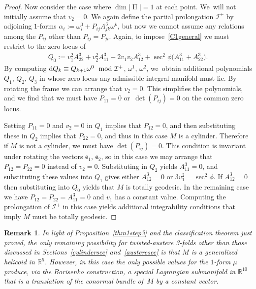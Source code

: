 \documentclass[10pt,a4paper]{amsart}
\def\R{\mathbb{R}}
\def\ve{\mathsf{e}}
\def\II{\operatorname{II}} %
\def\I{\mathcal{I}}
\def\w{\omega}
\newtheorem{Remark}[Theorem]{Remark}}
\numberwithin{equation}{section}
\begin{document}
\begin{proof}
Now consider the case where $\dim |\II|=1$ at each point. We~will not initially assume that $v_2=0$. We again define the partial prolongation $\I^+$ by adjoining $1$-forms $\alpha_i := \w^0_i + P_{ij} A^3_{jk} \w^k$, but now we cannot assume any relations among the $P_{ij}$ other than $P_{ij}=P_{ji}$. Again, to impose~\eqref{C1general} we must restrict to the zero locus of
\begin{gather*}
Q_0:=v_1^2 A^3_{22} + v_2^2 A^3_{11} - 2 v_1 v_2 A^3_{12} + \sec^2\phi \big(A^3_{11} + A^3_{22}\big).
\end{gather*}
By computing ${\rm d} Q_k \equiv Q_{k+1} \w^0 \mod \I^+$, $\w^1$, $\w^2$, we~obtain additional polynomials $Q_1$, $Q_2$, $Q_3$ in whose zero locus any admissible integral manifold must lie. By rotating the frame we can arrange that $v_2=0$. This simplifies the polynomials, and we find that we must have $P_{11}=0$ or~$\det(P_{ij})=0$ on the common zero locus.

Setting $P_{11}=0$ and $v_2=0$ in $Q_1$ implies that $P_{12}=0$, and then substituting these in $Q_2$ implies that $P_{22}=0$, and thus in this case $M$ is a cylinder. Therefore if $M$ is not a cylinder, we must have $\det(P_{ij})=0$. This condition is invariant under rotating the vectors $\ve_1$, $\ve_2$, so in this case we may arrange that $P_{12}=P_{22}=0$ instead of $v_2=0$. Substituting in $Q_2$ yields $A^3_{11}=0$, and substituting these values into $Q_1$ gives either $A^3_{12}=0$ or $3 v_1^2=\sec^2\phi$. If $A^3_{12}=0$ then substituting into $Q_0$ yields that $M$ is totally geodesic. In the remaining case we have $P_{12}=P_{22}=A^3_{11}=0$ and $v_1$ has a constant value. Computing the prolongation of $\I^+$ in this case yields additional integrability conditions that imply $M$ must be totally geodesic.
\end{proof}

\begin{Remark}
In light of Proposition~\ref{thm1step3} and the classification theorem just proved, the only remaining possibility for twisted-austere 3-folds other than those discussed in Sections~\ref{cylindersec} and~\ref{austeresec} is that $M$ is a generalized helicoid in $\R^5$. However, in this case the only possible values for the $1$-form $\mu$ produce, via the Borisenko construction, a special Lagrangian submanifold in $\R^{10}$ that is a translation of the conormal bundle of~$M$ by a constant vector.
\end{Remark}

\appendix
\end{document}
